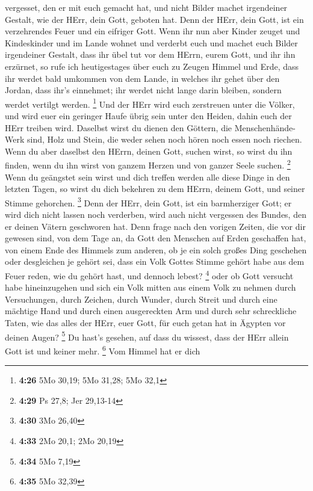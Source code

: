 vergesset, den er mit euch gemacht hat, und nicht Bilder machet
irgendeiner Gestalt, wie der HErr, dein Gott, geboten hat. 
Denn der HErr, dein Gott, ist ein verzehrendes Feuer und ein eifriger
Gott.  Wenn ihr nun aber Kinder zeuget und Kindeskinder und
im Lande wohnet und verderbt euch und machet euch Bilder irgendeiner
Gestalt, dass ihr übel tut vor dem HErrn, eurem Gott, und ihr ihn
erzürnet,  so rufe ich heutigestages über euch zu Zeugen
Himmel und Erde, dass ihr werdet bald umkommen von dem Lande, in welches
ihr gehet über den Jordan, dass ihr's einnehmet; ihr werdet nicht lange
darin bleiben, sondern werdet vertilgt werden. \footnote{\textbf{4:26}
  5Mo 30,19; 5Mo 31,28; 5Mo 32,1}  Und der HErr wird euch
zerstreuen unter die Völker, und wird euer ein geringer Haufe übrig sein
unter den Heiden, dahin euch der HErr treiben wird. 
Daselbst wirst du dienen den Göttern, die Menschenhände-Werk sind, Holz
und Stein, die weder sehen noch hören noch essen noch riechen.
 Wenn du aber daselbst den HErrn, deinen Gott, suchen
wirst, so wirst du ihn finden, wenn du ihn wirst von ganzem Herzen und
von ganzer Seele suchen. \footnote{\textbf{4:29} Ps 27,8; Jer 29,13-14}
 Wenn du geängstet sein wirst und dich treffen werden alle
diese Dinge in den letzten Tagen, so wirst du dich bekehren zu dem
HErrn, deinem Gott, und seiner Stimme gehorchen. \footnote{\textbf{4:30}
  3Mo 26,40}  Denn der HErr, dein Gott, ist ein
barmherziger Gott; er wird dich nicht lassen noch verderben, wird auch
nicht vergessen des Bundes, den er deinen Vätern geschworen hat.
 Denn frage nach den vorigen Zeiten, die vor dir gewesen
sind, von dem Tage an, da Gott den Menschen auf Erden geschaffen hat,
von einem Ende des Himmels zum anderen, ob je ein solch großes Ding
geschehen oder desgleichen je gehört sei,  dass ein Volk
Gottes Stimme gehört habe aus dem Feuer reden, wie du gehört hast, und
dennoch lebest? \footnote{\textbf{4:33} 2Mo 20,1; 2Mo 20,19}
 oder ob Gott versucht habe hineinzugehen und sich ein Volk
mitten aus einem Volk zu nehmen durch Versuchungen, durch Zeichen, durch
Wunder, durch Streit und durch eine mächtige Hand und durch einen
ausgereckten Arm und durch sehr schreckliche Taten, wie das alles der
HErr, euer Gott, für euch getan hat in Ägypten vor deinen Augen?
\footnote{\textbf{4:34} 5Mo 7,19}  Du hast's gesehen, auf
dass du wissest, dass der HErr allein Gott ist und keiner mehr.
\footnote{\textbf{4:35} 5Mo 32,39}  Vom Himmel hat er dich
